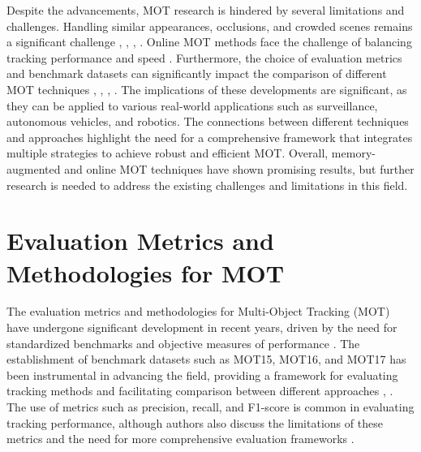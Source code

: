 \documentclass[conference]{IEEEtran}
\begin{document}
Despite the advancements, MOT research is hindered by several limitations and challenges. Handling similar appearances, occlusions, and crowded scenes remains a significant challenge \cite{Multiple Object Tracking in Recent Times: A Literature Review}, \cite{Multiple Object Tracking: A Literature Review}, \cite{Heuristic Search for Structural Constraints in Data Association}, \cite{Discriminative Appearance Modeling with Multi-track Pooling for Real-time Multi-object Tracking}. Online MOT methods face the challenge of balancing tracking performance and speed \cite{Real-time Online Multi-Object Tracking in Compressed Domain}. Furthermore, the choice of evaluation metrics and benchmark datasets can significantly impact the comparison of different MOT techniques \cite{Multiple Object Tracking in Recent Times: A Literature Review}, \cite{Multiple Object Tracking: A Literature Review}, \cite{Heuristic Search for Structural Constraints in Data Association}, \cite{Discriminative Appearance Modeling with Multi-track Pooling for Real-time Multi-object Tracking}. The implications of these developments are significant, as they can be applied to various real-world applications such as surveillance, autonomous vehicles, and robotics. The connections between different techniques and approaches highlight the need for a comprehensive framework that integrates multiple strategies to achieve robust and efficient MOT. Overall, memory-augmented and online MOT techniques have shown promising results, but further research is needed to address the existing challenges and limitations in this field.

\section{Evaluation Metrics and Methodologies for MOT}
The evaluation metrics and methodologies for Multi-Object Tracking (MOT) have undergone significant development in recent years, driven by the need for standardized benchmarks and objective measures of performance \cite{MOTChallenge: A Benchmark for Multi-Object Tracking}. The establishment of benchmark datasets such as MOT15, MOT16, and MOT17 has been instrumental in advancing the field, providing a framework for evaluating tracking methods and facilitating comparison between different approaches \cite{CVPR19 Tracking and Detection Challenge: How crowded can it get?}, \cite{MOT17: A Benchmark for Multi-Object Tracking}. The use of metrics such as precision, recall, and F1-score is common in evaluating tracking performance, although authors also discuss the limitations of these metrics and the need for more comprehensive evaluation frameworks \cite{Multiple Object Tracking: A Review}.
\end{document}
